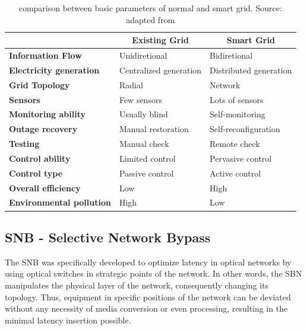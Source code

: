 \documentclass[conference]{IEEEtran}
\begin{document}
\begin{table}[tbp]
\begin{tabular}{l|l|l|}
\cline{2-3}
 & \multicolumn{1}{c|}{\textbf{Existing Grid}} & \multicolumn{1}{c|}{\textbf{Smart Grid}} \\ \hline
\multicolumn{1}{|l|}{\textbf{Information Flow}} & Unidiretional & Bidiretional \\ \hline
\multicolumn{1}{|l|}{\textbf{Electricity generation}} & Centralized generation & Distributed generation \\ \hline
\multicolumn{1}{|l|}{\textbf{Grid Topology}} & Radial & Network \\ \hline
\multicolumn{1}{|l|}{\textbf{Sensors}} & Few sensors & Lots of sensors \\ \hline
\multicolumn{1}{|l|}{\textbf{Monitoring ability}} & Usually blind & Self-monitoring \\ \hline
\multicolumn{1}{|l|}{\textbf{Outage recovery}} & Manual restoration & Self-reconfiguration \\ \hline
\multicolumn{1}{|l|}{\textbf{Testing}} & Manual check & Remote check \\ \hline
\multicolumn{1}{|l|}{\textbf{Control ability}} & Limited control & Pervasive control \\ \hline
\multicolumn{1}{|l|}{\textbf{Control type}} & Passive control & Active control \\ \hline
\multicolumn{1}{|l|}{\textbf{Overall efficiency}} & Low & High \\ \hline
\multicolumn{1}{|l|}{\textbf{Environmental pollution}} & High & Low \\ \hline
\end{tabular}
\caption{comparison between basic parameters of normal and smart grid. Source: adapted from \cite{Art-Ma2013}}
\label{tab_comparacao_grids}
\end{table}
	
\subsection{SNB - Selective Network Bypass}
The SNB was specifically developed to optimize latency in optical networks by using optical switches in strategic points of the network. In other words, the SBN manipulates the physical layer of the network, consequently changing its topology. Thus, equipment in specific positions of the network can be deviated without any necessity of media conversion or even processing, resulting in the minimal latency insertion possible.
\end{document}
